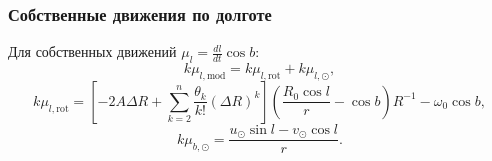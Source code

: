 \documentclass{matmex-diploma-custom}
\begin{document}
\subsubsection{Собственные движения по долготе} \label{def_mod_l}
Для собственных движений $\mu_l = \frac{dl}{dt}\cos{b}$:
\begin{equation}
        k\mu_{l, \mathrm{mod}} = k\mu_{l, \mathrm{rot}} + k\mu_{l, \odot},
\end{equation}
\begin{equation}
        k\mu_{l, \mathrm{rot}} = \left[ -2A\Delta R + \sum^n_{k = 2} \frac{\theta_k}{k!} \left( \Delta R \right)^k \right] \left( \frac{R_0\cos{l}}{r} - \cos{b} \right) R^{-1} - \omega_0 \cos{b},
\end{equation}
\begin{equation}
        k\mu_{b, \odot} = \frac{u_{\odot}\sin{l}- v_{\odot}\cos{l}}{r}.
\end{equation}
\end{document}
